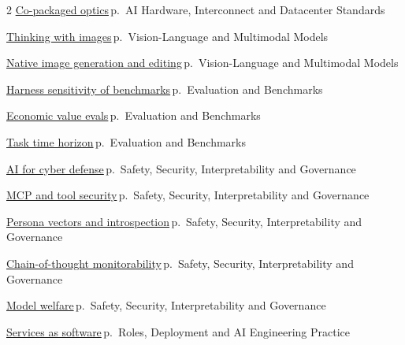 \documentclass[10pt,a4paper,openany]{report}
\begin{document}
\begin{multicols}{2}
\hyperref[c:hardware-10]{Co-packaged optics}\,{\color{muted}\scriptsize p.\,\pageref{c:hardware-10}} {\color{muted}\scriptsize AI Hardware, Interconnect and Datacenter Standards}\par\vspace{2pt}
\hyperref[c:vlm-3]{Thinking with images}\,{\color{muted}\scriptsize p.\,\pageref{c:vlm-3}} {\color{muted}\scriptsize Vision-Language and Multimodal Models}\par\vspace{2pt}
\hyperref[c:vlm-8]{Native image generation and editing}\,{\color{muted}\scriptsize p.\,\pageref{c:vlm-8}} {\color{muted}\scriptsize Vision-Language and Multimodal Models}\par\vspace{2pt}
\hyperref[c:evals-1]{Harness sensitivity of benchmarks}\,{\color{muted}\scriptsize p.\,\pageref{c:evals-1}} {\color{muted}\scriptsize Evaluation and Benchmarks}\par\vspace{2pt}
\hyperref[c:evals-7]{Economic value evals}\,{\color{muted}\scriptsize p.\,\pageref{c:evals-7}} {\color{muted}\scriptsize Evaluation and Benchmarks}\par\vspace{2pt}
\hyperref[c:evals-8]{Task time horizon}\,{\color{muted}\scriptsize p.\,\pageref{c:evals-8}} {\color{muted}\scriptsize Evaluation and Benchmarks}\par\vspace{2pt}
\hyperref[c:safety-1]{AI for cyber defense}\,{\color{muted}\scriptsize p.\,\pageref{c:safety-1}} {\color{muted}\scriptsize Safety, Security, Interpretability and Governance}\par\vspace{2pt}
\hyperref[c:safety-4]{MCP and tool security}\,{\color{muted}\scriptsize p.\,\pageref{c:safety-4}} {\color{muted}\scriptsize Safety, Security, Interpretability and Governance}\par\vspace{2pt}
\hyperref[c:safety-7]{Persona vectors and introspection}\,{\color{muted}\scriptsize p.\,\pageref{c:safety-7}} {\color{muted}\scriptsize Safety, Security, Interpretability and Governance}\par\vspace{2pt}
\hyperref[c:safety-8]{Chain-of-thought monitorability}\,{\color{muted}\scriptsize p.\,\pageref{c:safety-8}} {\color{muted}\scriptsize Safety, Security, Interpretability and Governance}\par\vspace{2pt}
\hyperref[c:safety-10]{Model welfare}\,{\color{muted}\scriptsize p.\,\pageref{c:safety-10}} {\color{muted}\scriptsize Safety, Security, Interpretability and Governance}\par\vspace{2pt}
\hyperref[c:practice-2]{Services as software}\,{\color{muted}\scriptsize p.\,\pageref{c:practice-2}} {\color{muted}\scriptsize Roles, Deployment and AI Engineering Practice}\par\vspace{2pt}
\end{multicols}
\end{document}
